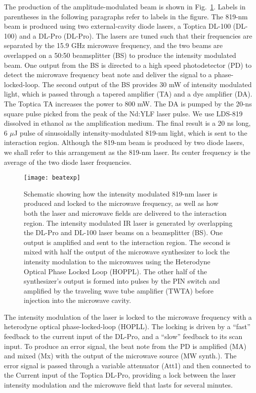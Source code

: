 \documentclass[aps,pra,reprint,groupedaddress]{revtex4-1}
\begin{document}
The production of the amplitude-modulated beam is shown in Fig.~\ref{fig:pll}. Labels in parentheses in the following paragraphs refer to labels in the figure. The 819-nm beam is produced using two external-cavity diode lasers, a Toptica DL-100 (DL-100) and a DL-Pro (DL-Pro). The lasers are tuned such that their frequencies are separated by the 15.9 GHz microwave frequency, and the two beams are overlapped on a 50:50 beamsplitter (BS) to produce the intensity modulated beam. One output from the BS is directed to a high speed photodetector (PD) to detect the microwave frequency beat note and deliver the signal to a phase-locked-loop. The second output of the BS provides 30 mW of intensity modulated light, which is passed through a tapered amplifier (TA) and a dye amplifier (DA). The Toptica TA increases the power to 800 mW. The DA is pumped by the 20-ns square pulse picked from the peak of the Nd:YLF laser pulse. We use LDS-819 dissolved in ethanol as the amplification medium. The final result is a 20 ns long, 6 $\mu$J pulse of sinusoidally intensity-modulated 819-nm light, which is sent to the interaction region. Although the 819-nm beam is produced by two diode lasers, we shall refer to this arrangement as the 819-nm laser. Its center frequency is the average of the two diode laser frequencies.

\begin{figure}
	\texttt{[image: beatexp]}
	\caption{Schematic showing how the intensity modulated 819-nm laser is produced and locked to the microwave frequency, as well as how both the laser and microwave fields are delivered to the interaction region. The intensity modulated IR laser is generated by overlapping the DL-Pro and DL-100 laser beams on a beamsplitter (BS). One output is amplified and sent to the interaction region. The second is mixed with half the output of the microwave synthesizer to lock the intensity modulation to the microwaves using the Heterodyne Optical Phase Locked Loop (HOPPL). The other half of the synthesizer's output is formed into pulses by the PIN switch and amplified by the traveling wave tube amplifier (TWTA) before injection into the microwave cavity. }
	\label{fig:pll}
\end{figure}

The intensity modulation of the laser is locked to the microwave frequency with a heterodyne optical phase-locked-loop (HOPLL). The locking is driven by a ``fast'' feedback to the current input of the DL-Pro, and a ``slow'' feedback to its scan input. To produce an error signal, the beat note from the PD is amplified (MA) and mixed (Mx) with the output of the microwave source (MW synth.). The error signal is passed through a variable attenuator (Att1) and then connected to the Current input of the Toptica DL-Pro, providing a lock between the laser intensity modulation and the microwave field that lasts for several minutes.
\end{document}
